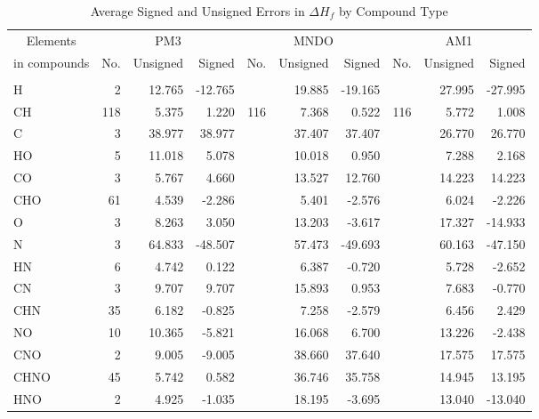 \begin{table}
\caption{\label{avehof}Average Signed and Unsigned Errors in $\Delta H_f$ by
 Compound Type}
\compresstable
\begin{center}
\begin{tabular}{lrrrrrrrrr}
\multicolumn{1}{c}{Elements} & \multicolumn{3}{c}{PM3} & \multicolumn{3}{c}{MNDO} &
\multicolumn{3}{c}{AM1} \\
\multicolumn{1}{c}{in compounds} &  No. & Unsigned & Signed & No. & Unsigned & Signed & No. & Unsigned & Signed \\
\hline\\
      H       &      2 &   12.765 &  -12.765 &  &   19.885 &  -19.165 &  &   27.995 &  -27.995 \\
      CH      &    118 &    5.375 &    1.220 & 116 &    7.368 &    0.522 & 116 &    5.772 &    1.008 \\
      C       &      3 &   38.977 &   38.977 &  &   37.407 &   37.407 &  &   26.770 &   26.770 \\
      HO      &      5 &   11.018 &    5.078 &  &   10.018 &    0.950 &  &    7.288 &    2.168 \\
      CO      &      3 &    5.767 &    4.660 &  &   13.527 &   12.760 &  &   14.223 &   14.223 \\
      CHO     &     61 &    4.539 &   -2.286 &  &    5.401 &   -2.576 &  &    6.024 &   -2.226 \\
      O       &      3 &    8.263 &    3.050 &  &   13.203 &   -3.617 &  &   17.327 &  -14.933 \\
      N       &      3 &   64.833 &  -48.507 &  &   57.473 &  -49.693 &  &   60.163 &  -47.150 \\
      HN      &      6 &    4.742 &    0.122 &  &    6.387 &   -0.720 &  &    5.728 &   -2.652 \\
      CN      &      3 &    9.707 &    9.707 &  &   15.893 &    0.953 &  &    7.683 &   -0.770 \\
      CHN     &     35 &    6.182 &   -0.825 &  &    7.258 &   -2.579 &  &    6.456 &    2.429 \\
      NO      &     10 &   10.365 &   -5.821 &  &   16.068 &    6.700 &  &   13.226 &   -2.438 \\
      CNO     &      2 &    9.005 &   -9.005 &  &   38.660 &   37.640 &  &   17.575 &   17.575 \\
      CHNO    &     45 &    5.742 &    0.582 &  &   36.746 &   35.758 &  &   14.945 &   13.195 \\
      HNO     &      2 &    4.925 &   -1.035 &  &   18.195 &   -3.695 &  &   13.040 &  -13.040 \\

\end{tabular}
\end{center}
\end{table}
